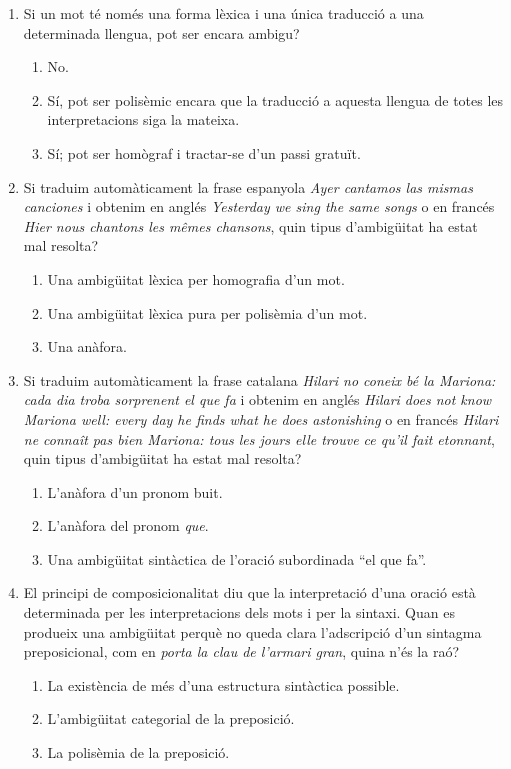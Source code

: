 \begin{enumerate}
\item Si un mot té només una forma lèxica i una única traducció a una
  determinada llengua, pot ser encara ambigu?
  \begin{enumerate}
  \item No.
  \item Sí, pot ser polisèmic encara que la traducció a aquesta
    llengua de totes les interpretacions siga la mateixa.
  \item Sí; pot ser homògraf i tractar-se d'un passi gratuït.
  \end{enumerate}

\item Si traduim automàticament la frase espanyola \emph{Ayer cantamos
    las mismas canciones} i obtenim en anglés \emph{Yesterday we sing
    the same songs} o en francés \emph{Hier nous chantons les mêmes
    chansons}, quin tipus d'ambigüitat ha estat mal resolta?
  \begin{enumerate}
  \item Una ambigüitat lèxica per homografia d'un mot.
  \item Una ambigüitat lèxica pura per polisèmia d'un mot.
  \item Una anàfora.
  \end{enumerate}

\item Si traduim automàticament la frase catalana \emph{Hilari no coneix
  bé la Mariona: cada dia troba sorprenent el que fa} i obtenim en
  anglés \emph{Hilari does not know Mariona well: every day he finds what
  he does astonishing} o en francés \emph{Hilari ne connaît pas bien
  Mariona: tous les jours elle trouve ce qu'il fait etonnant}, quin
  tipus d'ambigüitat ha estat mal resolta?
  \begin{enumerate}
  \item L'anàfora d'un pronom buit.
  \item L'anàfora del pronom \emph{que}.
  \item Una ambigüitat sintàctica de l'oració subordinada ``el que
    fa''.
  \end{enumerate}

\item El principi de composicionalitat diu que la interpretació d'una
  oració està determinada per les interpretacions dels mots i per la
  sintaxi. Quan es produeix una ambigüitat perquè no queda clara
  l'adscripció d'un sintagma preposicional, com en \emph{porta la clau
    de l'armari gran}, quina n'és la raó?  
  \begin{enumerate}
  \item La existència de més d'una estructura sintàctica possible.
  \item L'ambigüitat categorial de la preposició.
  \item La polisèmia de la preposició.
  \end{enumerate}


\end{enumerate}
